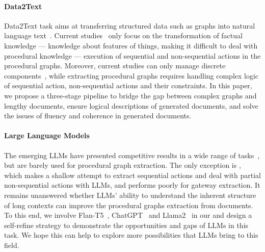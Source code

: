 \paragraph{Data2Text}

Data2Text task aims at transferring structured data such as graphs into natural language text~\cite{duong2023learning, lin2023survey}.
Current studies~\cite{su2021few, kasner2022neural} only focus on the transformation of factual knowledge --- knowledge about features of things, making it difficult to deal with procedural knowledge --- execution of sequential and non-sequential actions in the procedural graphs.
Moreover, current studies can only manage discrete components~\cite{ye2019variational, fu2020partially}, while extracting procedural graphs requires handling complex logic of sequential action, non-sequential actions and their constraints. In this paper, we propose a three-stage pipeline to bridge the gap between complex graphs and lengthy documents, ensure logical descriptions of generated documents, and solve the issues of fluency and coherence in generated documents.

\paragraph{Large Language Models}

The emerging LLMs have presented competitive results in a wide range of tasks~\cite{zhao2023survey}, but are barely used for procedural graph extraction.
The only exception is \citet{bellan2022leveraging}, which makes a shallow attempt to extract sequential actions and deal with partial non-sequential actions with LLMs, and performs poorly for gateway extraction. It remains unanswered whether LLMs' ability to understand the inherent structure of long contexts can improve the procedural graphs extraction from documents. To this end, we involve Flan-T5~\cite{chung2022scaling}, ChatGPT~\cite{ouyang2022training} and Llama2~\cite{touvron2023llama} in our \benchmark and design a self-refine strategy to demonstrate the opportunities and gaps of LLMs in this task. We hope this can help to explore more possibilities that LLMs bring to this field.
